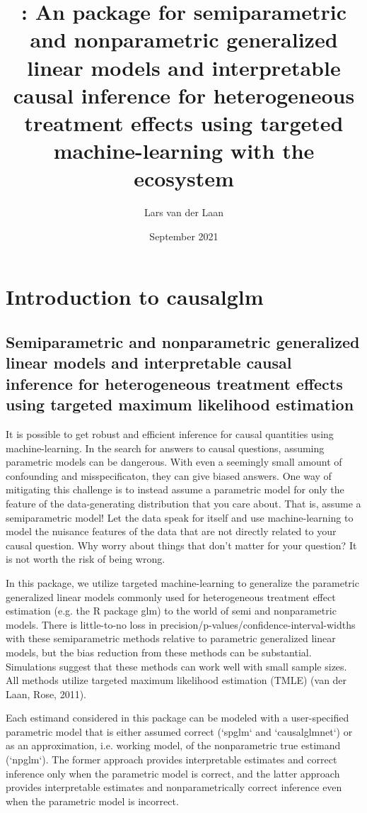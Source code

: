 \documentclass[article]{jss}
\title{%
  \pkg{causalglm}: An \proglang{R} package for semiparametric and nonparametric generalized linear models and interpretable causal inference for heterogeneous treatment effects using targeted machine-learning with the \pkg{tlverse} ecosystem
  }
\author{Lars van der Laan }
\date{September 2021}
\begin{document}


\maketitle



\section{Introduction to causalglm}
\subsection{Semiparametric and nonparametric generalized linear models and interpretable causal inference for heterogeneous treatment effects using targeted maximum likelihood estimation}


It is possible to get robust and efficient inference for causal quantities using machine-learning. In the search for answers to causal questions, assuming parametric models can be dangerous. With even a seemingly small amount of confounding and misspecificaton, they can give biased answers. One way of mitigating this challenge is to instead assume a parametric model for only the feature of the data-generating distribution that you care about. That is, assume a semiparametric model! Let the data speak for itself and use machine-learning to model the nuisance features of the data that are not directly related to your causal question. Why worry about things that don't matter for your question? It is not worth the risk of being wrong.

In this package, we utilize targeted machine-learning to generalize the parametric generalized linear models commonly used for heterogeneous treatment effect estimation (e.g. the R package glm) to the world of semi and nonparametric models. There is little-to-no loss in precision/p-values/confidence-interval-widths with these semiparametric methods relative to parametric generalized linear models, but the bias reduction from these methods can be substantial. Simulations suggest that these methods can work well with small sample sizes. All methods utilize targeted maximum likelihood estimation (TMLE) (van der Laan, Rose, 2011).\nocite{vanderLaanRose2011}

Each estimand considered in this package can be modeled with a user-specified parametric model that is either assumed correct (`spglm` and `causalglmnet`) or as an approximation, i.e. working model, of the nonparametric true estimand (`npglm`). The former approach provides interpretable estimates and correct inference only when the parametric model is correct, and the latter approach provides interpretable estimates and nonparametrically correct inference even when the parametric model is incorrect.
\end{document}
